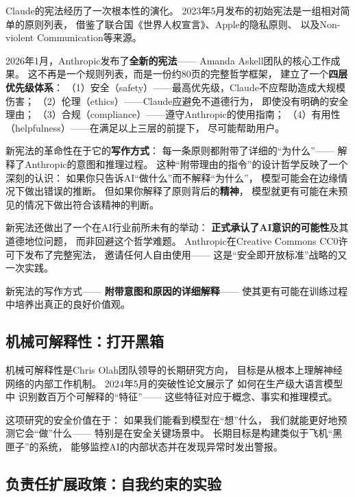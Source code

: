 \begin{keybox}[从规则列表到哲学框架]
Claude的宪法经历了一次根本性的演化。
2023年5月发布的初始宪法是一组相对简单的原则列表，
借鉴了联合国《世界人权宣言》、Apple的隐私原则、
以及Non-violent Communication等来源。

2026年1月，Anthropic发布了\textbf{全新的宪法}——
Amanda Askell团队的核心工作成果。
这不再是一个规则列表，而是一份约80页的完整哲学框架，
建立了一个\textbf{四层优先级体系}：
（1）安全（safety）——最高优先级，Claude不应帮助造成大规模伤害；
（2）伦理（ethics）——Claude应避免不道德行为，
即使没有明确的安全理由；
（3）合规（compliance）——遵守Anthropic的使用指南；
（4）有用性（helpfulness）——在满足以上三层的前提下，
尽可能帮助用户。

新宪法的革命性在于它的\textbf{写作方式}：
每一条原则都附带了详细的``为什么''——
解释了Anthropic的意图和推理过程。
这种``附带理由的指令''的设计哲学反映了一个深刻的认识：
如果你只告诉AI``做什么''而不解释``为什么''，
模型可能会在边缘情况下做出错误的推断。
但如果你解释了原则背后的\textbf{精神}，
模型就更有可能在未预见的情况下做出符合该精神的判断。

新宪法还做出了一个在AI行业前所未有的举动：
\textbf{正式承认了AI意识的可能性}及其道德地位问题，
而非回避这个哲学难题。
Anthropic在Creative Commons CC0许可下发布了完整宪法，
邀请任何人自由使用——
这是``安全即开放标准''战略的又一次实践。
\end{keybox}

新宪法的写作方式——
\textbf{附带意图和原因的详细解释}——
使其更有可能在训练过程中培养出真正的良好价值观。

\subsection{机械可解释性：打开黑箱}
\label{subsec:mech-interp}

机械可解释性是Chris Olah团队领导的长期研究方向，
目标是从根本上理解神经网络的内部工作机制。
2024年5月的突破性论文展示了
如何在生产级大语言模型中
识别数百万个可解释的``特征''——
这些特征对应于概念、事实和推理模式。

这项研究的安全价值在于：
如果我们能看到模型在``想''什么，
我们就能更好地预测它会``做''什么——
特别是在安全关键场景中。
长期目标是构建类似于飞机``黑匣子''的系统，
能够监控AI的内部状态并在发现异常时发出警报。

\subsection{负责任扩展政策：自我约束的实验}
\label{subsec:rsp}

